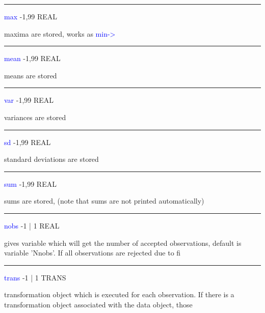 \hrule
\vspace{0.3cm}
\noindent \textcolor{blue}{max}  \tabto{3cm} -1,99 \tabto{5cm}  REAL \tabto{7cm}
\begin{changemargin}{3cm}{0cm}
\noindent  maxima are stored, works as \textcolor{blue}{min->}
\end{changemargin}
\vspace{0.3cm}
\hrule
\vspace{0.3cm}
\noindent \textcolor{blue}{mean}  \tabto{3cm} -1,99 \tabto{5cm}  REAL  \tabto{7cm}
\begin{changemargin}{3cm}{0cm}
\noindent  means are stored
\end{changemargin}
\vspace{0.3cm}
\hrule
\vspace{0.3cm}
\noindent \textcolor{blue}{var}  \tabto{3cm} -1,99 \tabto{5cm}  REAL \tabto{7cm}
\begin{changemargin}{3cm}{0cm}
\noindent  variances are stored
\end{changemargin}
\vspace{0.3cm}
\hrule
\vspace{0.3cm}
\noindent \textcolor{blue}{sd}  \tabto{3cm} -1,99 \tabto{5cm}  REAL \tabto{7cm}
\begin{changemargin}{3cm}{0cm}
\noindent  standard deviations are stored
\end{changemargin}
\vspace{0.3cm}
\hrule
\vspace{0.3cm}
\noindent \textcolor{blue}{sum}  \tabto{3cm} -1,99 \tabto{5cm}  REAL \tabto{7cm}
\begin{changemargin}{3cm}{0cm}
\noindent 	sums are stored, (note that sums are not printed automatically)
\end{changemargin}
\vspace{0.3cm}
\hrule
\vspace{0.3cm}
\noindent \textcolor{blue}{nobs}  \tabto{3cm} -1 | 1 \tabto{5cm}  REAL \tabto{7cm}
\begin{changemargin}{3cm}{0cm}
\noindent 	gives variable which will get the number of accepted observations, default is variable 'Nnobs'. If all observations are rejected due to fi
\end{changemargin}
\vspace{0.3cm}
\hrule
\vspace{0.3cm}
\noindent \textcolor{blue}{trans}  \tabto{3cm} -1 | 1 \tabto{5cm}  TRANS \tabto{7cm}
\begin{changemargin}{3cm}{0cm}
\noindent 	transformation object which is executed for each observation. If there is a transformation object associated with the data object, those
\end{changemargin}
